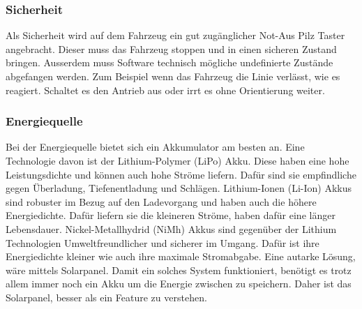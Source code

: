 \subsubsection{Sicherheit}
Als Sicherheit wird auf dem Fahrzeug ein gut zugänglicher Not-Aus Pilz Taster angebracht. Dieser muss das Fahrzeug stoppen und in einen sicheren Zustand bringen. Ausserdem muss Software technisch mögliche undefinierte Zustände abgefangen werden. Zum Beispiel wenn das Fahrzeug die Linie verlässt, wie es reagiert. Schaltet es den Antrieb aus oder irrt es ohne Orientierung weiter.

\subsubsection{Energiequelle}
Bei der Energiequelle bietet sich ein Akkumulator am besten an. Eine Technologie davon ist der Lithium-Polymer (LiPo) Akku. Diese haben eine hohe Leistungsdichte und können auch hohe Ströme liefern. Dafür sind sie empfindliche gegen Überladung, Tiefenentladung und Schlägen. Lithium-Ionen (Li-Ion) Akkus sind robuster im Bezug auf den Ladevorgang und haben auch die höhere Energiedichte. Dafür liefern sie die kleineren Ströme, haben dafür eine länger Lebensdauer. Nickel-Metallhydrid (NiMh) Akkus sind gegenüber der Lithium Technologien Umweltfreundlicher und sicherer im Umgang. Dafür ist ihre Energiedichte kleiner wie auch ihre maximale Stromabgabe. Eine autarke Lösung, wäre mittels Solarpanel. Damit ein solches System funktioniert, benötigt es trotz allem immer noch ein Akku um die Energie zwischen zu speichern. Daher ist das Solarpanel, besser als ein Feature zu verstehen.

